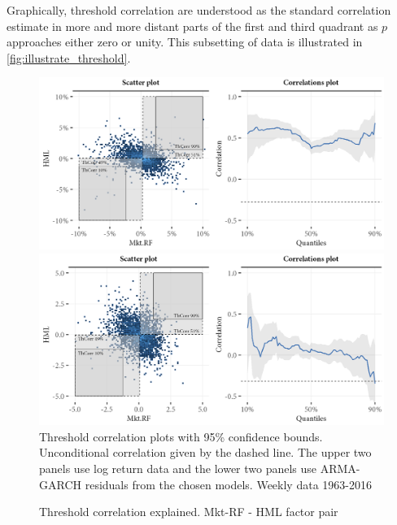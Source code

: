 Graphically, threshold correlation are understood as the standard correlation estimate in more and more distant parts of the first and third quadrant as $p$ approaches either zero or unity. This subsetting of data is illustrated in \autoref{fig:illustrate_threshold}. 

\begin{figure}[htbp]
  \caption{Threshold correlation explained. Mkt-RF - HML factor pair}
  \label{fig:illustrate_threshold}
  \centering
  \begin{minipage}{\textwidth}
  \includegraphics[scale=1]{graphics/threshold_explain_ret.png}  
  \includegraphics[scale=1]{graphics/threshold_explain_res.png}  
  \vspace{3mm}
  \footnotesize
  Threshold correlation plots with 95\% confidence bounds. Unconditional correlation given by the dashed line. The upper two panels use log return data and the lower two panels use ARMA-GARCH residuals from the chosen models. Weekly data 1963-2016
  \end{minipage}
\end{figure}

